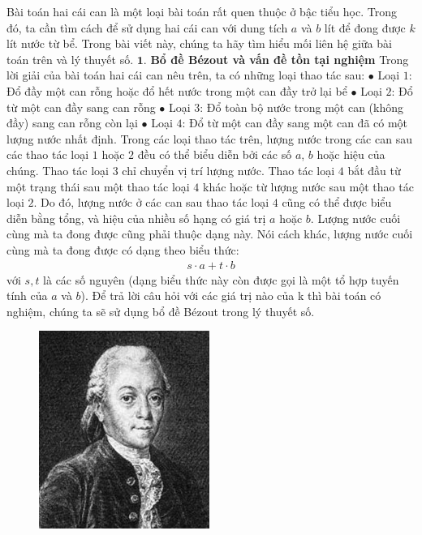 \begin{multicols}{2}
	Bài toán hai cái can là một loại bài toán rất quen thuộc ở bậc tiểu học. Trong đó, ta cần tìm cách để sử dụng hai cái can với dung tích $a$ và $b$ lít để đong được $k$ lít nước từ bể. Trong bài viết này, chúng ta hãy tìm hiểu mối liên hệ giữa bài toán trên và lý thuyết số.
	\vskip 0.1cm
	$\pmb{1.}$ \textbf{\color{hoccungpi}Bổ đề Bézout và vấn đề tồn tại nghiệm}
	\vskip 0.1cm
	Trong lời giải của bài toán hai cái can nêu trên, ta có những loại thao tác sau:
	\vskip 0.1cm
	$\bullet$ Loại $1$: Đổ đầy một can rỗng hoặc đổ hết nước trong một can đầy trở lại bể
	\vskip 0.1cm
	$\bullet$ Loại $2$: Đổ từ một can đầy sang can rỗng
	\vskip 0.1cm
	$\bullet$ Loại $3$: Đổ toàn bộ nước trong một can (không đầy) sang can rỗng còn lại
	\vskip 0.1cm
	$\bullet$ Loại $4$: Đổ từ một can đầy sang một can đã có một lượng nước nhất định. 
	\vskip 0.1cm
	Trong các loại thao tác trên, lượng nước trong các can sau các thao tác loại $1$ hoặc $2$ đều có thể  biểu diễn bởi các số $a$, $b$ hoặc hiệu của chúng. Thao tác loại $3$ chỉ chuyển vị trí lượng nước. Thao tác loại $4$ bắt đầu từ một trạng thái sau một thao tác loại $4$ khác hoặc từ lượng nước sau một thao tác loại $2$. Do đó, lượng nước ở các can sau thao tác loại $4$ cũng có thể được biểu diễn bằng tổng, và hiệu của nhiều số hạng có giá trị $a$ hoặc $b$. Lượng nước cuối cùng mà ta đong được cũng phải thuộc dạng này.
	\vskip 0.1cm
	Nói cách khác, lượng nước cuối cùng mà ta đong được có dạng theo biểu thức: 
	\begin{align*}
		s\cdot a+ t\cdot b
	\end{align*}
	với $s,t$ là các số nguyên (dạng biểu thức này còn được gọi là một tổ hợp tuyến tính của $a$ và $b$). Để trả lời câu hỏi với các giá trị nào của k thì bài toán có nghiệm, chúng ta sẽ sử dụng bổ đề Bézout trong lý thuyết số.
	\begin{figure}[H]
		\centering
		\vspace*{-5pt}
		\captionsetup{labelformat= empty, justification=centering}
		\includegraphics[width=0.75\linewidth]{1}

\end{figure}
\end{multicols}
